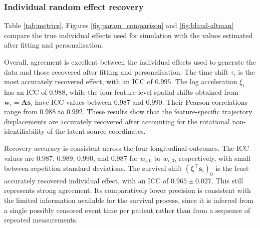 \documentclass{rapportCS}
\begin{document}
\subsubsection{Individual random effect recovery}

Table \ref{tab:metrics}, Figures \ref{fig:param_comparison} and \ref{fig:bland-altman} compare the true individual effects used for simulation with the values estimated after fitting and personalisation. 

Overall, agreement is excellent between the individual effects used to generate the data and those recovered after fitting and personalisation. The time shift $\tau_i$ is the most accurately recovered effect, with an ICC of $0.995$. The log acceleration $\xi_i$ has an ICC of $0.988$, while the four feature-level spatial shifts obtained from $\mathbf{w}_i=\mathbf{A}\mathbf{s}_i$ have ICC values between $0.987$ and $0.990$. Their Pearson correlations range from $0.988$ to $0.992$. These results show that the feature-specific trajectory displacements are accurately recovered after accounting for the rotational non-identifiability of the latent source coordinates.

Recovery accuracy is consistent across the four longitudinal outcomes. The ICC values are $0.987$, $0.989$, $0.990$, and $0.987$ for $w_{i,0}$ to $w_{i,3}$, respectively, with small between-repetition standard deviations. The survival shift $(\boldsymbol{\zeta}^{\top}\mathbf{s}_i)_0$ is the least accurately recovered individual effect, with an ICC of $0.965 \pm 0.027$. This still represents strong agreement. Its comparatively lower precision is consistent with the limited information available for the survival process, since it is inferred from a single possibly censored event time per patient rather than from a sequence of repeated measurements.
\end{document}
